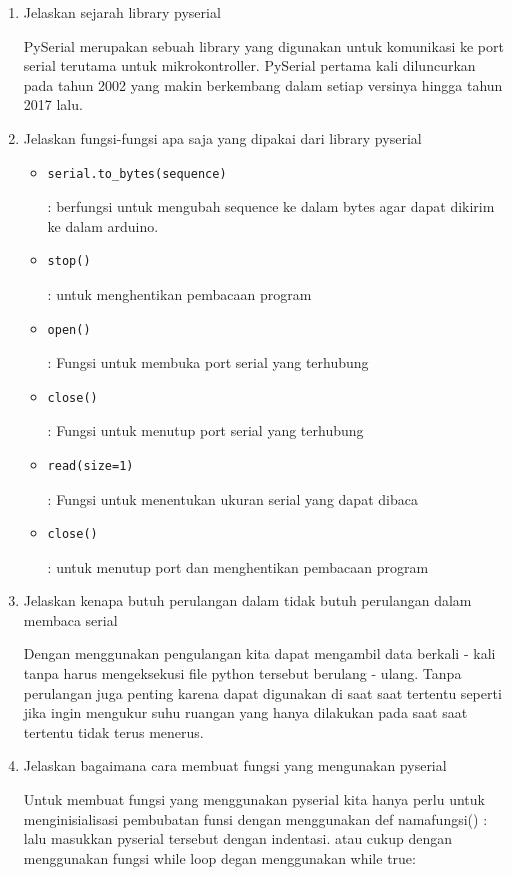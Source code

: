 \begin{enumerate}
	\item Jelaskan sejarah library pyserial
	\par
	PySerial merupakan sebuah library yang digunakan untuk komunikasi ke port serial terutama untuk mikrokontroller. PySerial pertama kali diluncurkan pada tahun 2002 yang makin berkembang dalam setiap versinya hingga tahun 2017 lalu.
	
	\item Jelaskan fungsi-fungsi apa saja yang dipakai dari library pyserial
		\begin{itemize}
			\item \begin{verbatim}serial.to_bytes(sequence)\end{verbatim} : berfungsi untuk mengubah sequence ke dalam bytes agar dapat dikirim ke dalam arduino.
			\item \begin{verbatim}stop()\end{verbatim} : untuk menghentikan pembacaan program
			\item \begin{verbatim}open()\end{verbatim} : Fungsi untuk membuka port serial yang terhubung
			\item \begin{verbatim}close()\end{verbatim} : Fungsi untuk menutup port serial yang terhubung
			\item \begin{verbatim}read(size=1) \end{verbatim} : Fungsi untuk menentukan ukuran serial yang dapat dibaca
			\item \begin{verbatim}close()\end{verbatim} : untuk menutup port dan menghentikan pembacaan program
		\end{itemize}
	
	\item Jelaskan kenapa butuh perulangan dalam tidak butuh perulangan dalam membaca serial
	\par
	Dengan menggunakan pengulangan kita dapat mengambil data berkali - kali tanpa harus mengeksekusi file python tersebut berulang - ulang. Tanpa perulangan juga penting karena dapat digunakan di saat saat tertentu seperti jika ingin mengukur suhu ruangan yang hanya dilakukan pada saat saat tertentu tidak terus menerus.
	
	\item Jelaskan bagaimana cara membuat fungsi yang mengunakan pyserial
	\par
	Untuk membuat fungsi yang menggunakan pyserial kita hanya perlu untuk menginisialisasi pembubatan funsi dengan menggunakan def namafungsi() : lalu masukkan pyserial tersebut dengan indentasi. atau cukup dengan menggunakan fungsi while loop degan menggunakan while true:
	
\end{enumerate}

